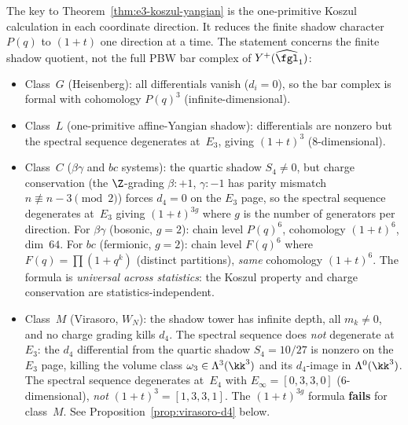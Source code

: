 \begin{remark}
\label{rem:class-l-spectral-mechanism}
The key to Theorem~\ref{thm:e3-koszul-yangian} is the one-primitive
Koszul calculation in each coordinate direction. It reduces the finite
shadow character \(P(q)\) to \((1+t)\) one direction at a time. The
statement concerns the finite shadow quotient, not the full PBW bar
complex of \(Y^+(\widehat{\fgl}_1)\):
\begin{itemize}
 \item Class~$G$ (Heisenberg): all differentials vanish ($d_i = 0$), so the bar complex is formal with cohomology $P(q)^3$ (infinite-dimensional).
 \item Class~$L$ (one-primitive affine-Yangian shadow): differentials are nonzero but the spectral sequence degenerates at~$E_3$, giving $(1+t)^3$ ($8$-dimensional).
 \item Class~$C$ ($\beta\gamma$ and $bc$ systems): the quartic shadow $S_4 \neq 0$, but charge conservation (the $\Z$-grading $\beta: +1$, $\gamma: -1$ has parity mismatch $n \not\equiv n{-}3 \pmod{2}$) forces $d_4 = 0$ on the $E_3$ page, so the spectral sequence degenerates at~$E_3$ giving $(1+t)^{3g}$ where $g$ is the number of generators per direction. For $\beta\gamma$ (bosonic, $g = 2$): chain level $P(q)^6$, cohomology $(1+t)^6$, dim~$64$. For $bc$ (fermionic, $g = 2$): chain level $F(q)^6$ where $F(q) = \prod(1+q^k)$ (distinct partitions), \emph{same} cohomology $(1+t)^6$. The formula is \emph{universal across statistics}: the Koszul property and charge conservation are statistics-independent.
 \item Class~$M$ (Virasoro, $W_N$): the shadow tower has infinite depth, all $m_k \neq 0$, and no charge grading kills $d_4$. The spectral sequence does \emph{not} degenerate at~$E_3$: the $d_4$ differential from the quartic shadow $S_4 = 10/27$ is nonzero on the $E_3$ page, killing the volume class $\omega_3 \in \Lambda^3(\kk^3)$ and its $d_4$-image in $\Lambda^0(\kk^3)$. The spectral sequence degenerates at~$E_4$ with $E_\infty = [0, 3, 3, 0]$ ($6$-dimensional), \emph{not} $(1+t)^3 = [1,3,3,1]$. The $(1+t)^{3g}$ formula \textbf{fails} for class~$M$. See Proposition~\ref{prop:virasoro-d4} below.
\end{itemize}
\end{remark}

